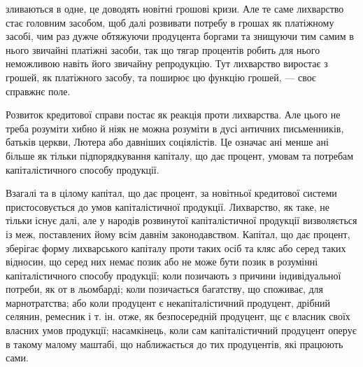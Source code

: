 зливаються в одне, це доводять новітні грошові кризи. Але те саме лихварство стає
головним засобом, щоб далі розвивати потребу в грошах як платіжному засобі,
чим раз дужче обтяжуючи продуцента боргами та знищуючи тим самим в нього
звичайні платіжні засоби, так що тягар процентів робить для нього неможливою
навіть його звичайну репродукцію. Тут лихварство виростає з грошей, як платіжного
засобу, та поширює цю функцію грошей, — своє справжнє поле.

Розвиток кредитової справи постає як реакція проти лихварства. Але цього
не треба розуміти хибно й ніяк не можна розуміти в дусі античних письменників,
батьків церкви, Лютера або давніших соціялістів. Це означає ані менше ані
більше як тільки підпорядкування капіталу, що дає процент, умовам та потребам
капіталістичного способу продукції.

Взагалі та в цілому капітал, що дає процент, за новітньої кредитової системи
пристосовується до умов капіталістичної продукції. Лихварство, як таке, не
тільки існує далі, але у народів розвинутої капіталістичної продукції визволяється
із меж, поставлених йому всім давнім законодавством. Капітал, що дає
процент, зберігає форму лихварського капіталу проти таких осіб та кляс або
серед таких відносин, що серед них немає позик або не може бути позик в розумінні
капіталістичного способу продукції; коли позичають з причини індивідуальної
потреби, як от в льомбарді; коли позичається багатству, що споживає,
для марнотратства; або коли продуцент є некапіталістичний продуцент, дрібний
селянин, ремесник і т. ін. отже, як безпосередній продуцент, щє є власник своїх
власних умов продукції; насамкінець, коли сам капіталістичний продуцент оперує
в такому малому маштабі, що наближається до тих продуцентів, які працюють сами.

